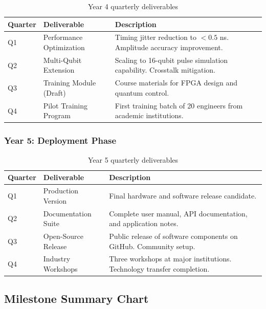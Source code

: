 \documentclass[12pt,a4paper]{article}
\theoremstyle{definition}
\begin{document}
\begin{longtable}{@{}p{1.5cm}p{4cm}p{7cm}@{}}
\caption{Year 4 quarterly deliverables} \label{tab:year4} \\
\toprule
\textbf{Quarter} & \textbf{Deliverable} & \textbf{Description} \\
\midrule
\endfirsthead
Q1 & Performance Optimization & Timing jitter reduction to $<0.5$ ns. Amplitude accuracy improvement. \\
\midrule
Q2 & Multi-Qubit Extension & Scaling to 16-qubit pulse simulation capability. Crosstalk mitigation. \\
\midrule
Q3 & Training Module (Draft) & Course materials for FPGA design and quantum control. \\
\midrule
Q4 & Pilot Training Program & First training batch of 20 engineers from academic institutions. \\
\bottomrule
\end{longtable}

\subsubsection{Year 5: Deployment Phase}

\begin{longtable}{@{}p{1.5cm}p{4cm}p{7cm}@{}}
\caption{Year 5 quarterly deliverables} \label{tab:year5} \\
\toprule
\textbf{Quarter} & \textbf{Deliverable} & \textbf{Description} \\
\midrule
\endfirsthead
Q1 & Production Version & Final hardware and software release candidate. \\
\midrule
Q2 & Documentation Suite & Complete user manual, API documentation, and application notes. \\
\midrule
Q3 & Open-Source Release & Public release of software components on GitHub. Community setup. \\
\midrule
Q4 & Industry Workshops & Three workshops at major institutions. Technology transfer completion. \\
\bottomrule
\end{longtable}

\subsection{Milestone Summary Chart}
\end{document}
